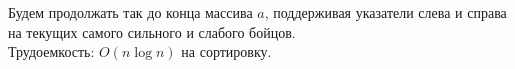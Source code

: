 \documentclass[10pt]{article}
\begin{document}
\begin{enumerate}
Будем продолжать так до конца массива $a$, поддерживая указатели слева и справа на текущих самого сильного и слабого бойцов.\\
Трудоемкость: $O(n \log n)$ на сортировку.

\end{enumerate}
\end{document}
